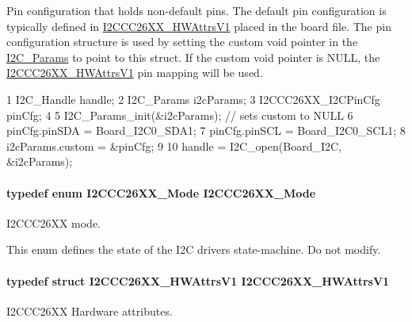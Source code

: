 Pin configuration that holds non-\/default pins. The default pin configuration is typically defined in \hyperlink{struct_i2_c_c_c26_x_x___h_w_attrs_v1}{I2\+C\+C\+C26\+X\+X\+\_\+\+H\+W\+Attrs\+V1} placed in the board file. The pin configuration structure is used by setting the custom void pointer in the \hyperlink{struct_i2_c___params}{I2\+C\+\_\+\+Params} to point to this struct. If the custom void pointer is N\+U\+L\+L, the \hyperlink{struct_i2_c_c_c26_x_x___h_w_attrs_v1}{I2\+C\+C\+C26\+X\+X\+\_\+\+H\+W\+Attrs\+V1} pin mapping will be used. 
\begin{DoxyCode}
1 I2C\_Handle handle;
2 I2C\_Params i2cParams;
3 I2CCC26XX\_I2CPinCfg pinCfg;
4 
5 I2C\_Params\_init(&i2cParams);     // sets custom to NULL
6 pinCfg.pinSDA = Board\_I2C0\_SDA1;
7 pinCfg.pinSCL = Board\_I2C0\_SCL1;
8 i2cParams.custom = &pinCfg;
9 
10 handle = I2C\_open(Board\_I2C, &i2cParams);
\end{DoxyCode}
\paragraph[{I2\+C\+C\+C26\+X\+X\+\_\+\+Mode}]{\setlength{\rightskip}{0pt plus 5cm}typedef enum {\bf I2\+C\+C\+C26\+X\+X\+\_\+\+Mode}  {\bf I2\+C\+C\+C26\+X\+X\+\_\+\+Mode}}\label{_i2_c_c_c26_x_x_8h_a8eaf242bab570cb7c90d5108c6dca937}


I2\+C\+C\+C26\+X\+X mode. 

This enum defines the state of the I2\+C driver\textquotesingle{}s state-\/machine. Do not modify. 
\paragraph[{I2\+C\+C\+C26\+X\+X\+\_\+\+H\+W\+Attrs\+V1}]{\setlength{\rightskip}{0pt plus 5cm}typedef struct {\bf I2\+C\+C\+C26\+X\+X\+\_\+\+H\+W\+Attrs\+V1}  {\bf I2\+C\+C\+C26\+X\+X\+\_\+\+H\+W\+Attrs\+V1}}\label{_i2_c_c_c26_x_x_8h_a84b33b790b23b7b5317fca113a7fb691}


I2\+C\+C\+C26\+X\+X Hardware attributes. 

